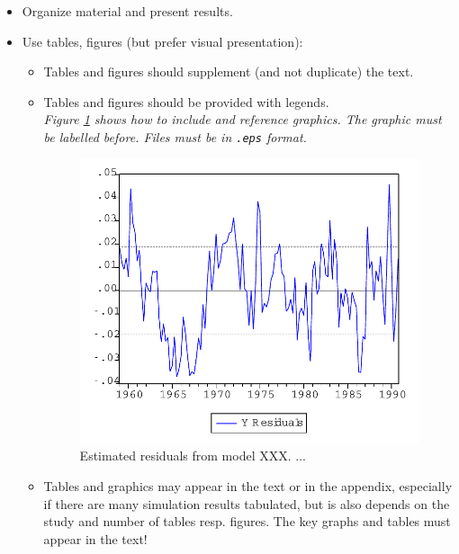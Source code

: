 \begin{itemize}
    \item Organize material and present results.
    \item Use tables, figures (but prefer visual presentation):
        \begin{itemize}
            \item Tables and figures should supplement (and not duplicate) the text.
            \item Tables and figures should be provided with legends.\\
                {\it Figure \ref{Fig:Resids} shows how to include and reference
                graphics. The graphic must be labelled before. Files must be in
                \texttt{.eps} format.}

                \begin{figure}[ht]
                \begin{center}
                    \includegraphics[scale=0.5,angle=0]{graph}
                    \caption{Estimated residuals from model XXX. ...}
                    \label{Fig:Resids}
                \end{center}
                \end{figure}

            \item Tables and graphics may appear in the text or in
                the appendix, especially if there are many simulation results
                tabulated, but is also depends on the study and number of tables resp.
                figures. The key graphs and tables must appear in
                the text!
        \end{itemize}
        


\end{itemize}
